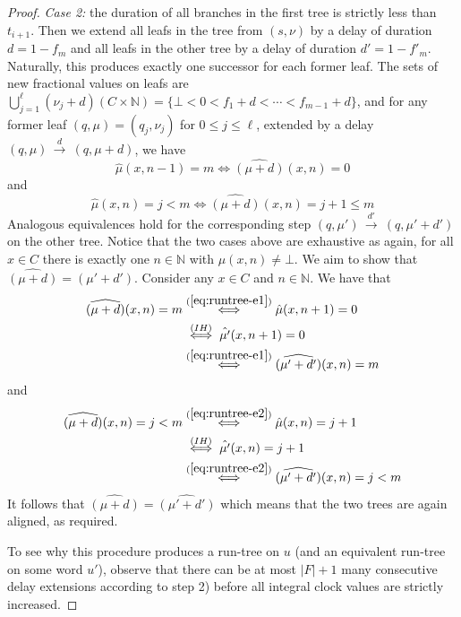 \documentclass[10pt,a4paper]{amsart}
\theoremstyle{definition}
\numberwithin{equation}{section}
\newcommand{\N}{\mathbb{N}}
\newcommand{\x}{\times}
\newcommand{\card}[1]{|#1|}
\newcommand{\clocks}{C}
\newcommand{\step}[2][]{\Step{#2}{}{#1}}
\newcommand{\Step}[3]{\ensuremath{\,{\stackrel{#1}{\longrightarrow}}{}^{\scriptstyle{#2}}_{\scriptstyle{#3}}}\,}
\begin{document}
\begin{proof}
    \smallskip
    \emph{Case 2: } the duration of all branches in the first tree is strictly less than $t_{i+1}$.
    Then we extend all leafs in the tree from $(s,\nu)$ by a delay of duration $d=1-f_m$
    and all leafs in the other tree by a delay of duration $d'=1-f'_m$.
    Naturally, this produces exactly one successor for each former leaf.
    The sets of new fractional values on leafs are
    $\bigcup_{j=1}^\ell(\nu_j+d)(\clocks\x\N) = \{\bot<0<f_1+d<\cdots<f_{m-1}+d\}$,
    and for any former leaf $(q,\mu)= (q_j,\nu_j)$ for $0\le j\le \ell$, extended by a delay $(q,\mu)\step{d}(q,\mu+d)$,
    we have 
    \begin{equation}
        \label{eq:runtree-e1}
        \hat{\mu}(x,n-1) = m \iff \widehat{(\mu+d)}(x,n) = 0
    \end{equation}
    and 
    \begin{equation}
        \label{eq:runtree-e2}
        \hat{\mu}(x,n) = j < m \iff \widehat{(\mu+d)}(x,n) = j+1\le m
    \end{equation}
    Analogous equivalences hold for the corresponding step
    $(q,\mu')\step{d'}(q,\mu'+d')$ on the other tree.
    Notice that the two cases above are exhaustive as 
    again, for all $x\in\clocks$ there is exactly one $n\in\N$ with
    $\mu(x,n)\neq\bot$.
    We aim to show that $\widehat{(\mu+d)}=\widehat{(\mu'+d')}$.
    Consider any $x\in\clocks$ and $n\in\N$. We have that
    \begin{align*}
    \widehat{(\mu+d)}(x,n) = m  %
        &\stackrel{(\ref{eq:runtree-e1})}{\iff}
        \hat{\mu}(x,n+1)=0\\
        &\stackrel{(IH)}{\iff}
        \hat{\mu'}(x,n+1)=0\\
        &\stackrel{(\ref{eq:runtree-e1})}{\iff}
    \widehat{(\mu'+d')}(x,n) = m 
    \end{align*}
    and
    \begin{align*}
    \widehat{(\mu+d)}(x,n)=j < m%
        &\stackrel{(\ref{eq:runtree-e2})}{\iff}
        \hat{\mu}(x,n)=j+1\\
        &\stackrel{(IH)}{\iff}
        \hat{\mu'}(x,n)=j+1\\
        &\stackrel{(\ref{eq:runtree-e2})}{\iff}
        \widehat{(\mu'+d')}(x,n) = j<m
    \end{align*}
    It follows that $\widehat{(\mu+d)}=\widehat{(\mu'+d')}$ which means that the two trees are again aligned, as required.


    To see why this procedure produces a run-tree on $u$ (and an equivalent run-tree on some word $u'$),
    observe that 
    there can be at most $\card{F}+1$ many consecutive delay extensions
    according to step 2) before all integral clock values are strictly increased.
\end{proof}
\end{document}
